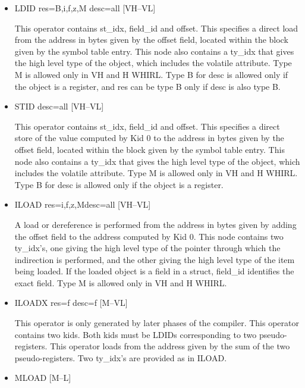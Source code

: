 \documentclass{article}
\begin{document}
\begin{itemize}

\item
{}%
LDID res=B,i,f,z,M desc=all \hfill [VH--VL]

This operator contains st\_idx, field\_id and offset. This specifies
a direct load from the address in bytes given by the offset field,
located within the
block given by the symbol table entry. This node also contains a
ty\_idx that gives the high level type of the object, which includes
the volatile attribute. Type M is allowed only in VH and H WHIRL.
Type B for desc is allowed only if the object is a register, and
res can be type B only if desc is also type B. 

\item
{}%
STID desc=all \hfill [VH--VL]

This operator contains st\_idx, field\_id and offset. This specifies
a direct store of the value computed by Kid 0 to the address in
bytes given by the
offset field, located within the block given by the symbol table
entry. This node also contains a ty\_idx that gives the high level
type of the object, which includes the volatile attribute. Type M
is allowed only in VH and H WHIRL. Type B for desc is allowed only
if the object is a register.

\item
{}%
ILOAD res=i,f,z,Mdesc=all \hfill [VH--VL]

A load or dereference is performed from the address in bytes given
by adding the offset field to the address computed by Kid 0. This
node contains two ty\_idx's, one giving the high level type of the
pointer through which the indirection is performed, and the other
giving the high level type of the item being loaded. If the loaded
object is a field in a struct, field\_id identifies the exact field.
Type M is allowed only in VH and H WHIRL. 

\item
{}%
ILOADX res=f desc=f \hfill [M--VL]

This operator is only generated by later phases of the compiler.
This operator contains two kids. Both kids must be
%
LDIDs corresponding to two
pseudo-registers. This operator loads from the address
given by the sum of the two pseudo-registers. Two ty\_idx's are
provided as in
%
ILOAD.

\item
{}%
MLOAD \hfill [M--L]


\end{itemize}
\end{document}
